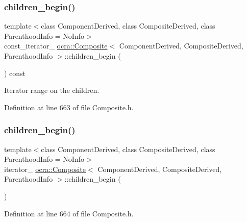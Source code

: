 \subsubsection{\texorpdfstring{children\+\_\+begin()}{children\_begin()}\hspace{0.1cm}{\footnotesize\ttfamily [1/2]}}
{\footnotesize\ttfamily template$<$class Component\+Derived, class Composite\+Derived, class Parenthood\+Info = No\+Info$>$ \\
const\+\_\+iterator\+\_\+ \hyperlink{classocra_1_1Composite}{ocra\+::\+Composite}$<$ Component\+Derived, Composite\+Derived, Parenthood\+Info $>$\+::children\+\_\+begin (\begin{DoxyParamCaption}{ }\end{DoxyParamCaption}) const\hspace{0.3cm}{\ttfamily [inline]}}



Iterator range on the children. 



Definition at line 663 of file Composite.\+h.

\hypertarget{classocra_1_1Composite_ab5ec766141bb1d85ad8c32fdafe5e041}{}\label{classocra_1_1Composite_ab5ec766141bb1d85ad8c32fdafe5e041} 
\subsubsection{\texorpdfstring{children\+\_\+begin()}{children\_begin()}\hspace{0.1cm}{\footnotesize\ttfamily [2/2]}}
{\footnotesize\ttfamily template$<$class Component\+Derived, class Composite\+Derived, class Parenthood\+Info = No\+Info$>$ \\
iterator\+\_\+ \hyperlink{classocra_1_1Composite}{ocra\+::\+Composite}$<$ Component\+Derived, Composite\+Derived, Parenthood\+Info $>$\+::children\+\_\+begin (\begin{DoxyParamCaption}{ }\end{DoxyParamCaption})\hspace{0.3cm}{\ttfamily [inline]}}



Definition at line 664 of file Composite.\+h.

\hypertarget{classocra_1_1Composite_a1930b259df137386b64cd84e96b4d30e}{}\label{classocra_1_1Composite_a1930b259df137386b64cd84e96b4d30e} 
